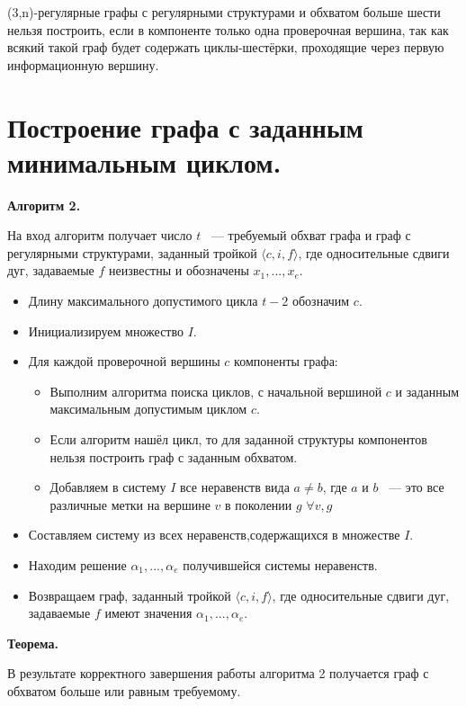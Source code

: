 \documentclass[14pt]{mmcs-article}
\begin{document}
(3,n)-регулярные графы с регулярными структурами и обхватом больше шести нельзя построить, если в компоненте только одна проверочная вершина, так как всякий такой граф будет содержать циклы-шестёрки, проходящие через первую информационную вершину.

\newpage

\section{Построение графа с заданным минимальным циклом.}

\textbf{Алгоритм 2.}

На вход алгоритм получает число $t$ ~--- требуемый обхват графа и граф с регулярными структурами, заданный тройкой $\langle c, i, f \rangle$, где односительные сдвиги дуг, задаваемые $f$ неизвестны и обозначены $x_1, ..., x_e$.  

\begin{itemize}
\item Длину максимального допустимого цикла $t - 2$ обозначим $c$.
\item Инициализируем множество $I$.
\item Для каждой проверочной вершины $c$ компоненты графа:
\begin{itemize}
  \item Выполним алгоритма поиска циклов, с начальной вершиной $c$ и заданным максимальным допустимым циклом $c$.
  \item Если алгоритм нашёл цикл, то для заданной структуры компонентов нельзя построить граф с заданным обхватом.
  \item Добавляем в систему $I$ все неравенств вида $a \neq b$, где $a$ и $b$ ~--- это все различные метки на вершине $v$ в поколении $g$ $\forall v, g$
\end{itemize}
\item Составляем систему из всех неравенств,содержащихся в множестве $I$.
\item Находим решение $\alpha_1, ..., \alpha_e$ получившейся системы неравенств.
\item Возвращаем граф, заданный тройкой $\langle c, i, f \rangle$, где односительные сдвиги дуг, задаваемые $f$ имеют значения $\alpha_1, ..., \alpha_e$.
\end{itemize}

\textbf{Теорема.}

В результате корректного завершения работы алгоритма 2 получается граф с обхватом больше или равным требуемому.
\end{document}
